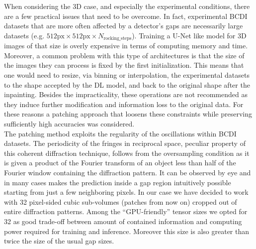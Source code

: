 When considering the 3D case, and especially the experimental conditions, there are a few practical issues that need
to be overcome. In fact, experimental BCDI datasets that are more often affected by a detector's gaps are necessarily large
datasets (e.g. $512\text{px} \times 512\text{px} \times N_{\text{rocking\_steps}}$). Training a U-Net like model for 
3D images of that size is 
overly expensive in terms of computing memory and time. Moreover, a common problem with this type of architectures is that
the size of the images they can process is fixed by the first initialization. This means that one would need to resize, via 
binning or interpolation, the experimental datasets to the shape accepted by the DL model, and back to the original
shape after the inpainting. Besides the impracticality, these operations are not recommended as they induce further
modification and information loss to the original data. For these reasons a patching approach that 
loosens these constraints while preserving sufficiently high accuracies was considered. \\

The patching method exploits the regularity of the oscillations within BCDI datasets. The periodicity of the fringes 
in reciprocal space, peculiar property of this coherent diffraction technique, follows from the oversampling condition 
as it is given a product of the Fourier transform 
of an object less than half of the Fourier window containing the diffraction pattern. It can be observed by eye and 
in many cases makes the prediction inside a gap region intuitively possible starting from just a few neighboring pixels. 
In our case we have decided to work with 32 pixel-sided cubic sub-volumes (patches from now on) cropped out of entire diffraction 
patterns. Among the ``GPU-friendly'' tensor sizes \cite{nvidia_tensor_cores_optimization} we opted for 32 as good trade-off
between amount of contained information and computing power required for training and inference. Moreover this size is 
also greater than twice the size of the usual gap sizes. 

